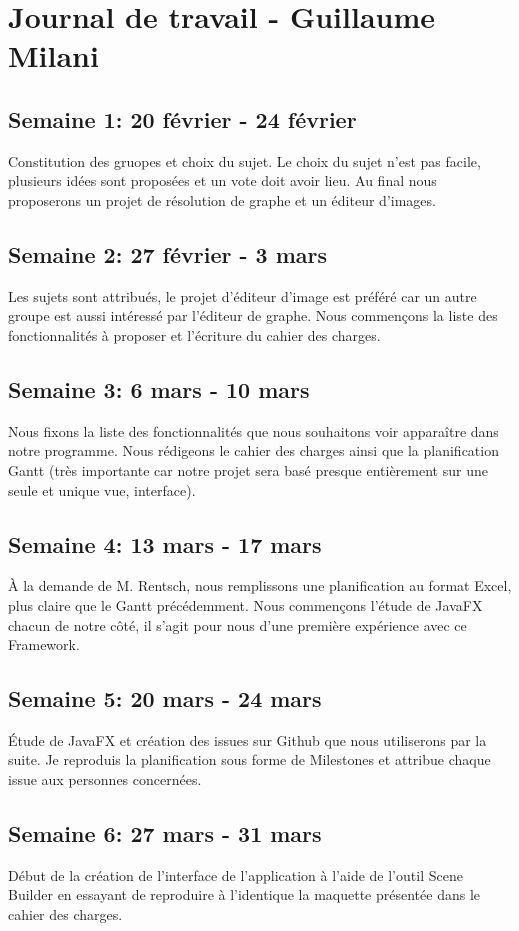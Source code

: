 \section{Journal de travail - Guillaume Milani}

\subsection{Semaine 1: 20 février - 24 février}
Constitution des gruopes et choix du sujet. Le choix du sujet n'est pas facile, plusieurs idées sont proposées et un vote doit avoir lieu. Au final nous proposerons un projet de résolution de graphe et un éditeur d'images.
\subsection{Semaine 2: 27 février - 3 mars}
Les sujets sont attribués, le projet d'éditeur d'image est préféré car un autre groupe est aussi intéressé par l'éditeur de graphe. Nous commençons la liste des fonctionnalités à proposer et l'écriture du cahier des charges.
\subsection{Semaine 3: 6 mars - 10 mars}
Nous fixons la liste des fonctionnalités que nous souhaitons voir apparaître dans notre programme. Nous rédigeons le cahier des charges ainsi que la planification Gantt (très importante car notre projet sera basé presque entièrement sur une seule et unique vue, interface).
\subsection{Semaine 4: 13 mars - 17 mars}
À la demande de M. Rentsch, nous remplissons une planification au format Excel, plus claire que le Gantt précédemment. Nous commençons l'étude de JavaFX chacun de notre côté, il s'agit pour nous d'une première expérience avec ce Framework.
\subsection{Semaine 5: 20 mars - 24 mars}
Étude de JavaFX et création des issues sur Github que nous utiliserons par la suite. Je reproduis la planification sous forme de Milestones et attribue chaque issue aux personnes concernées.
\subsection{Semaine 6: 27 mars - 31 mars}
Début de la création de l'interface de l'application à l'aide de l'outil Scene Builder en essayant de reproduire à l'identique la maquette présentée dans le cahier des charges.
